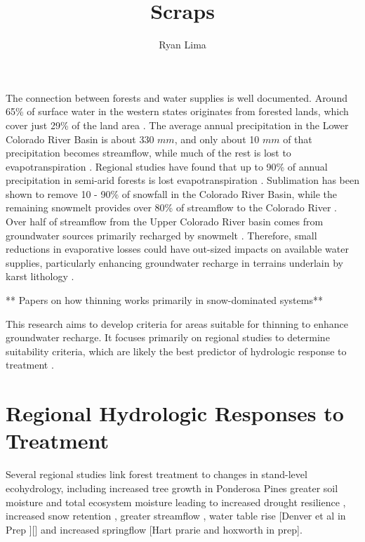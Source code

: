 \documentclass[
  number]{elsarticle}
\begin{document}
\begin{frontmatter}
\title{Scraps}
\author[]{Ryan Lima%
%
}




        





\end{frontmatter}
    
The connection between forests and water supplies is well documented.
Around 65\% of surface water in the western states originates from
forested lands, which cover just 29\% of the land area
\citep{brown_source_2005}. The average annual precipitation in the Lower
Colorado River Basin is about 330 \(mm\), and only about 10 \(mm\) of
that precipitation becomes streamflow, while much of the rest is lost to
evapotranspiration \citep{zou_streamflow_2010}. Regional studies have
found that up to 90\% of annual precipitation in semi-arid forests is
lost evapotranspiration
\citep{dore_recovery_2012, ha_evapotranspiration_2015, yaseef_ecohydrology_2010, hibbert1979}.
Sublimation has been shown to remove 10 - 90\% of snowfall in the
Colorado River Basin, while the remaining snowmelt provides over 80\% of
streamflow to the Colorado River \citep{lundquist_sublimation_2024}.
Over half of streamflow from the Upper Colorado River basin comes from
groundwater sources primarily recharged by snowmelt \citep{miller2016}.
Therefore, small reductions in evaporative losses could have out-sized
impacts on available water supplies, particularly enhancing groundwater
recharge in terrains underlain by karst lithology
\citep{hibbert1979, wyatt2013}.

** Papers on how thinning works primarily in snow-dominated systems**

This research aims to develop criteria for areas suitable for thinning
to enhance groundwater recharge. It focuses primarily on regional
studies to determine suitability criteria, which are likely the best
predictor of hydrologic response to treatment
\citep{wyatt_estimating_2013}.

\section{Regional Hydrologic Responses to
Treatment}\label{regional-hydrologic-responses-to-treatment}

Several regional studies link forest treatment to changes in stand-level
ecohydrology, including increased tree growth in Ponderosa Pines greater
soil moisture and total ecosystem moisture leading to increased drought
resilience \citep{sankey_regionalscale_2021, sankey_thinning_2022},
increased snow retention \citep{broxton_subseasonal_2023, belmonte2021},
greater streamflow \citep{baker_effects_1986}, water table rise
{[}Denver et al in Prep
{]}{[}\citep{smerdon_overview_2009}{]}\citep{schenk_impacts_2020} and
increased springflow \citep{schenk_impacts_2020}{[}Hart prarie and
hoxworth in prep{]}.
\end{document}
